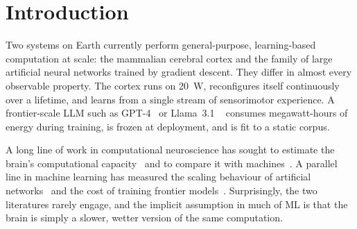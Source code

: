 \documentclass[11pt]{article}
\providecommand{\watt}{\ensuremath{\mathrm{W}}}
\theoremstyle{definition}
\theoremstyle{remark}
\begin{document}
\begin{abstract}
  \emph{thermodynamic precision--energy tradeoff} showing that the
  effective precision of any physical update is bounded by the
  logarithm of its Landauer overhead, unifying the cortical
  $\sim\!6.6$-bit precision and the $\sim\!10^{4}$-fold thermodynamic
  advantage as two facets of a single constraint; and \emph{(iii)}~a
  \emph{universal effective-precision bound} proving that any
  batch-averaged first-order method---SGD, Adam, AdaGrad, and
  variants---carries at most $\mathcal{O}(\iota_{0}\,d_{\mathrm{int}}/(BP))$
  bits of task-relevant information per update, establishing the
  $\mathcal{O}(1)$-bit ceiling as a property of the optimisation
  paradigm rather than of any particular optimiser.  We close with a
  convergence-roadmap theorem whose necessity clause is a formal
  partial-fix converse: progress on any proper subset of the four
  factors leaves $\Phi>10^{2}$, so the gap closes only when all four
  factors move together.
\end{abstract}

\section{Introduction}
\label{sec:intro}

Two systems on Earth currently perform general-purpose, learning-based
computation at scale: the mammalian cerebral cortex and the family of
large artificial neural networks trained by gradient descent.  They
differ in almost every observable property.  The cortex runs on
\SI{20}{\watt}, reconfigures itself continuously over a lifetime, and
learns from a single stream of sensorimotor experience.  A
frontier-scale LLM such as GPT-4~\cite{openai2023gpt4} or Llama~3.1
~\cite{meta2024llama31} consumes megawatt-hours of energy during
training, is frozen at deployment, and is fit to a static corpus.

A long line of work in computational neuroscience has sought to
estimate the brain's computational capacity~\cite{modha2009cognitive,
lennie2003cost, attwell2001energy, moravec1998robot} and to compare it
with machines~\cite{drachman2005we, modha2011ibmneurosynaptic}.  A
parallel line in machine learning has measured the scaling behaviour
of artificial networks~\cite{kaplan2020scaling, hoffmann2022chinchilla}
and the cost of training frontier models~\cite{patterson2021carbon,
thompson2020computational}.  Surprisingly, the two literatures rarely
engage, and the implicit assumption in much of ML is that the brain is
simply a slower, wetter version of the same computation.
\end{document}
